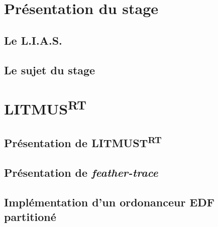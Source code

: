 \documentclass{article}
\begin{document}
    
\section*{Présentation du stage}
\subsection{Le L.I.A.S.}
\subsection{Le sujet du stage}

\section{LITMUS\textsuperscript{RT}}

\subsection{Présentation de LITMUST\textsuperscript{RT}}

\subsection{Présentation de \textit{feather-trace}}

\subsection{Implémentation d'un ordonanceur EDF partitioné}


\newpage


\printnoidxglossaries
\end{document}
